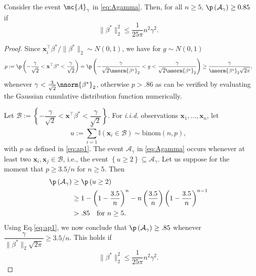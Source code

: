 \documentclass[11pt]{article}
\def\x{\mathbf{x}}
\begin{document}
\begin{lemma}\label{lem:low}
Consider the event $\mc{A}_{\gamma}$ in \eqref{eq:Agamma}. Then, for all $n \geq 5$, $\p\left( \mathcal{A}_{\gamma}\right)\ge 0.85$ if 
\begin{equation}\label{eq:lb}
\|\beta^*\|_2^2\le \dfrac{1}{25\pi}n^2\gamma^2.
\end{equation}
\end{lemma}
\begin{proof}
Since $\x_i^\top\beta^*/\|\beta^*\|_2 \sim N(0,1)$, we have for $g \sim N(0,1)$
\begin{equation}\label{eq:ap1}
p:=\p\left( -\dfrac{\gamma}{\sqrt{2}}<\x^\top\beta^*<\dfrac{\gamma}{\sqrt{2}}\right)=\p\left( -\dfrac{\gamma}{\sqrt{2}\nnorm{\beta^*}_2}<g<\dfrac{\gamma}{\sqrt{2}\nnorm{\beta^*}_2} \right)\ge \dfrac{\gamma}{\nnorm{\beta^*}_2\sqrt{2\pi}},
\end{equation}
whenever $\gamma < \frac{3}{\sqrt{2}} \nnorm{\beta^*}_2$, otherwise $p > .86$ as can be verified by evaluating the Gaussian cumulative distribution function numerically. 

\noindent Let  $\mathcal{B}:=\left\{-\dfrac{\gamma}{\sqrt{2}}<\x^\top\beta^*<\dfrac{\gamma}{\sqrt{2}}\right\}$. For \textit{i.i.d.} observations $\x_1,\ldots,\x_n$, let
\[
u:=\sum_{i=1}^n \mathbb{I}(\x_i\in \mathcal{B})\sim \text{binom}(n, p),
\]
with $p$ as defined in \eqref{eq:ap1}. The event $\mathcal{A}_{\gamma}$ in \eqref{eq:Agamma} occurs whenever at least two $\x_i, \x_j\in \mathcal{B}$, i.e., the event  $\left\{u\ge 2\right\}\subseteq\mathcal{A}_{\gamma}$. Let us suppose for the moment that $p \geq 3.5/n$ for $n\ge 5$.  Then
\begin{align*}
	\p\left(\mathcal{A}_{\gamma}\right)&\ge\p\left(u\ge 2\right)\\
&\geq 1-\left(1-\dfrac{3.5}{n}\right)^{n}-n\left(\dfrac{3.5}{n}\right)\left(1-\dfrac{3.5}{n}\right)^{n-1}\\
&>.85 \quad \text{for $n\ge 5$}.
\end{align*}
Using Eq.\eqref{eq:ap1}, we now conclude that $\p\left(\mathcal{A}_{\gamma}\right)\ge .85$ whenever $\dfrac{\gamma}{\|\beta^*\|_2 \sqrt{2\pi}}\ge 3.5/n$. This holds if 
\[
\|\beta^*\|_2^2 \le \dfrac{1}{25\pi}n^2 \gamma^2.
\]
\end{proof}
\end{document}
